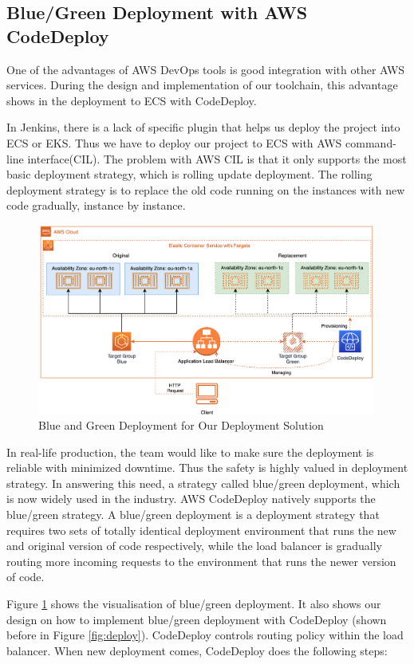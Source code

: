 \subsection{Blue/Green Deployment with AWS CodeDeploy}
One of the advantages of AWS DevOps tools is good integration with other AWS services. During the design and implementation of our toolchain, this advantage shows in the deployment to ECS with CodeDeploy.
\par
In Jenkins, there is a lack of specific plugin that helps us deploy the project into ECS or EKS. Thus we have to deploy our project to ECS with AWS command-line interface(CIL). The problem with AWS CIL is that it only supports the most basic deployment strategy, which is rolling update deployment. The rolling deployment strategy is to replace the old code running on the instances with new code gradually, instance by instance. 
\begin{figure}[h]
 \centering
 \includegraphics[width=0.99\textwidth]{pics/bg.png}
 \caption{Blue and Green Deployment for Our Deployment Solution}
 \label{fig:bg}
\end{figure}
\par
In real-life production, the team would like to make sure the deployment is reliable with minimized downtime. Thus the safety is highly valued in deployment strategy. In answering this need, a strategy called blue/green deployment, which is now widely used in the industry. AWS CodeDeploy natively supports the blue/green strategy.
A blue/green deployment is a deployment strategy that requires two sets of totally identical deployment environment that runs the new and original version of code respectively, while the load balancer is gradually routing more incoming requests to the environment that runs the newer version of code. 
\par
Figure \ref{fig:bg} shows the visualisation of blue/green deployment. It also shows our design on how to implement blue/green deployment with CodeDeploy (shown before in Figure \ref{fig:deploy}). CodeDeploy controls routing policy within the load balancer. When new deployment comes, CodeDeploy does the following steps:
